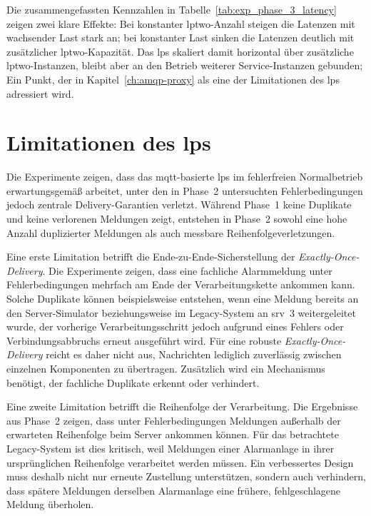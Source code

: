 Die zusammengefassten Kennzahlen in Tabelle~\ref{tab:exp_phase_3_latency} zeigen zwei klare Effekte: Bei konstanter \gls{lptwo}-Anzahl steigen die Latenzen mit wachsender Last stark an; bei konstanter Last sinken die Latenzen deutlich mit zusätzlicher \gls{lptwo}-Kapazität. Das \gls{lps} skaliert damit horizontal über zusätzliche \gls{lptwo}-Instanzen, bleibt aber an den Betrieb weiterer Service-Instanzen gebunden; Ein Punkt, der in Kapitel~\ref{ch:amqp-proxy} als eine der Limitationen des \gls{lps} adressiert wird.

\section{Limitationen des \acrshort{lps}}
\label{sec:mqtt-proxy-schwach}

Die Experimente zeigen, dass das \gls{mqtt}-basierte \gls{lps} im fehlerfreien Normalbetrieb erwartungsgemäß arbeitet, unter den in Phase~2 untersuchten Fehlerbedingungen jedoch zentrale Delivery-Garantien verletzt. Während Phase~1 keine Duplikate und keine verlorenen Meldungen zeigt, entstehen in Phase~2 sowohl eine hohe Anzahl duplizierter Meldungen als auch messbare Reihenfolgeverletzungen.

Eine erste Limitation betrifft die Ende-zu-Ende-Sicherstellung der \textit{Exactly-Once-Delivery}. Die Experimente zeigen, dass eine fachliche Alarmmeldung unter Fehlerbedingungen mehrfach am Ende der Verarbeitungskette ankommen kann. Solche Duplikate können beispielsweise entstehen, wenn eine Meldung bereits an den Server-Simulator beziehungsweise im Legacy-System an \gls{srv}~3 weitergeleitet wurde, der vorherige Verarbeitungsschritt jedoch aufgrund eines Fehlers oder Verbindungsabbruchs erneut ausgeführt wird. Für eine robuste \textit{Exactly-Once-Delivery} reicht es daher nicht aus, Nachrichten lediglich zuverlässig zwischen einzelnen Komponenten zu übertragen. Zusätzlich wird ein Mechanismus benötigt, der fachliche Duplikate erkennt oder verhindert.

Eine zweite Limitation betrifft die Reihenfolge der Verarbeitung. Die Ergebnisse aus Phase~2 zeigen, dass unter Fehlerbedingungen Meldungen außerhalb der erwarteten Reihenfolge beim Server ankommen können. Für das betrachtete Legacy-System ist dies kritisch, weil Meldungen einer Alarmanlage in ihrer ursprünglichen Reihenfolge verarbeitet werden müssen. Ein verbessertes Design muss deshalb nicht nur erneute Zustellung unterstützen, sondern auch verhindern, dass spätere Meldungen derselben Alarmanlage eine frühere, fehlgeschlagene Meldung überholen.

